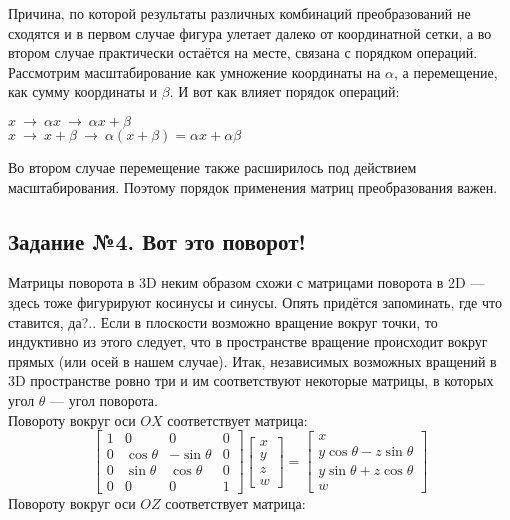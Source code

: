 \documentclass[a3paper,14pt]{extarticle}
\begin{document}
Причина, по которой результаты различных комбинаций преобразований не сходятся и в первом случае фигура улетает далеко от координатной сетки, а во втором случае практически остаётся на месте, связана с порядком операций. Рассмотрим масштабирование как умножение координаты на $\alpha$, а перемещение, как сумму координаты и $\beta$. И вот как влияет порядок операций:
\begin{center}
    $x \ \rightarrow\ \alpha x \ \rightarrow\ \alpha x + \beta$ \\
    $x \ \rightarrow\ x + \beta \ \rightarrow\ \alpha (x + \beta) = \alpha x + \alpha\beta$
\end{center}
Во втором случае перемещение также расширилось под действием масштабирования. Поэтому порядок применения матриц преобразования важен. \pagebreak

\subsection*{\centering Задание №4. Вот это поворот!}
Матрицы поворота в 3D неким образом схожи с матрицами поворота в 2D --- здесь тоже фигурируют косинусы и синусы. Опять придётся запоминать, где что ставится, да?.. Если в плоскости возможно вращение вокруг точки, то индуктивно из этого следует, что в пространстве вращение происходит вокруг прямых (или осей в нашем случае). Итак, независимых возможных вращений в 3D пространстве ровно три и им соответствуют некоторые матрицы, в которых угол $\theta$ --- угол поворота.\\[0.5em]
Повороту вокруг оси $OX$ соответствует матрица:
$$\begin{bmatrix}
    1 & 0 & 0 & 0 \\ 0 & \cos\theta & -\sin\theta & 0 \\ 0 & \sin\theta & \cos\theta & 0 \\ 0 & 0 & 0 & 1
\end{bmatrix}\begin{bmatrix}
    x \\ y \\ z \\ w
\end{bmatrix} = \begin{bmatrix}
    x \\ y\cos\theta - z\sin\theta \\ y\sin\theta + z\cos\theta \\ w
\end{bmatrix}$$
Повороту вокруг оси $OZ$ соответствует матрица:
\end{document}
